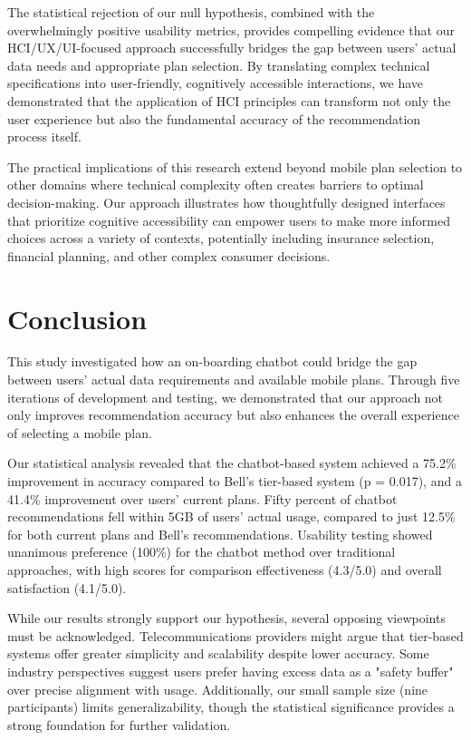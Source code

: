 \documentclass[conference]{IEEEtran}
\begin{document}
The statistical rejection of our null hypothesis, combined with the overwhelmingly positive usability metrics, provides compelling evidence that our HCI/UX/UI-focused approach successfully bridges the gap between users' actual data needs and appropriate plan selection. By translating complex technical specifications into user-friendly, cognitively accessible interactions, we have demonstrated that the application of HCI principles can transform not only the user experience but also the fundamental accuracy of the recommendation process itself.

The practical implications of this research extend beyond mobile plan selection to other domains where technical complexity often creates barriers to optimal decision-making. Our approach illustrates how thoughtfully designed interfaces that prioritize cognitive accessibility can empower users to make more informed choices across a variety of contexts, potentially including insurance selection, financial planning, and other complex consumer decisions.
\section{Conclusion}

This study investigated how an on-boarding chatbot could bridge the gap between users' actual data requirements and available mobile plans. Through five iterations of development and testing, we demonstrated that our approach not only improves recommendation accuracy but also enhances the overall experience of selecting a mobile plan.

Our statistical analysis revealed that the chatbot-based system achieved a 75.2\% improvement in accuracy compared to Bell's tier-based system (p = 0.017), and a 41.4\% improvement over users' current plans. Fifty percent of chatbot recommendations fell within 5GB of users' actual usage, compared to just 12.5\% for both current plans and Bell's recommendations. Usability testing showed unanimous preference (100\%) for the chatbot method over traditional approaches, with high scores for comparison effectiveness (4.3/5.0) and overall satisfaction (4.1/5.0).

While our results strongly support our hypothesis, several opposing viewpoints must be acknowledged. Telecommunications providers might argue that tier-based systems offer greater simplicity and scalability despite lower accuracy. Some industry perspectives suggest users prefer having excess data as a "safety buffer" over precise alignment with usage. Additionally, our small sample size (nine participants) limits generalizability, though the statistical significance provides a strong foundation for further validation.
\end{document}
